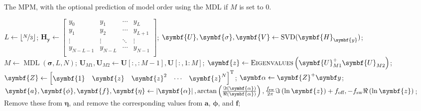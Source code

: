 \begin{algorithm}
    \caption[
        The \acl{MPM}, with the optional prediction of model order using the
        \acl{MDL}.
    ]
    {
        The \acs{MPM}, with the optional prediction of model order using the
        \acs{MDL} if $M$ is set to $0$.
    }\label{alg:mpm}
    \begin{algorithmic}[1]
            \State $L \gets \left\lfloor \nicefrac{N}{3} \right\rfloor$;
            \State $\symbf{H}_{\symbf{y}} \gets
                \begin{bmatrix}
                    y_{0} & y_{1} & \cdots & y_{L}\\
                    y_{1} & y_{2} & \cdots & y_{L+1}\\
                    \vdots & \vdots & \ddots & \vdots\\
                    y_{N-L-1} & y_{N-L} & \cdots & y_{N-1}\\
                \end{bmatrix}
            $;
            \State $\symbf{U}, \symbf{\sigma}, \symbf{V} \gets
            \SVD(\symbf{H}_{\symbf{y}})$;
                \State $M \gets \operatorname{MDL}(\symbf{\sigma}, L, N)$;
            \EndIf
            \State $\symbf{U}_{M1}, \symbf{U}_{M2} \gets
                \symbf{U}[:, :M-1], \symbf{U}[:, 1:M]
            $;
            \State $\symbf{z} \gets \textsc{Eigenvalues}\left(\symbf{U}_{M1}^+ \symbf{U}_{M2}^{\vphantom{+}}\right)$;
            \State $\symbf{Z} \gets
                \begin{bmatrix}
                    \symbf{1} & \symbf{z} & {\symbf{z}}^2 & \cdots & {\symbf{z}}^{N}
                \end{bmatrix}\T
            $;
            \State $\bdalpha \gets \symbf{Z}^+ \by$;
            \State $
                \symbf{a}, \symbf{\phi}, \symbf{f}, \symbf{\eta} \gets
                \left\lvert\symbf{\alpha}\right\rvert,
                    \arctan \left(\frac{\Im(\symbf{\alpha})}{\Re(\symbf{\alpha})}\right),
                    \frac{\fsw}{2\pi} \Im \left( \ln \symbf{z} \right) + \foff,
                    -\fsw \Re \left( \ln \symbf{z} \right)
                $;
                \State Remove these from $\symbf{\eta}$, and remove the
                corresponding values from
                $\symbf{a}$, $\symbf{\phi}$, and $\symbf{f}$;
            \EndIf

\end{algorithmic}
\end{algorithm}
